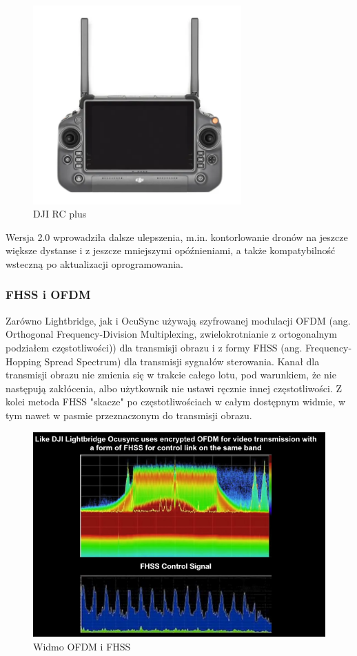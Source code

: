 \begin{figure}[!ht]
  \centering
  \includegraphics[width=8cm]{./Obrazy/dji-rc-plus.png}
  \caption{DJI RC plus}
  \end{figure}
  

Wersja 2.0 wprowadziła dalsze ulepszenia, m.in. kontorlowanie dronów na jeszcze większe dystanse i z jeszcze mniejszymi opóźnieniami, a także kompatybilność wsteczną po aktualizacji oprogramowania.

\newpage
\subsubsection{FHSS i  OFDM}

Zarówno Lightbridge, jak i OcuSync używają szyfrowanej modulacji OFDM (ang. Orthogonal Frequency-Division Multiplexing, zwielokrotnianie z ortogonalnym podziałem częstotliwości)) dla transmisji obrazu i z formy FHSS (ang. Frequency-Hopping Spread Spectrum) dla transmisji sygnałów sterowania. Kanał dla transmisji obrazu nie zmienia się w trakcie całego lotu, pod warunkiem, że nie następują zakłócenia, albo użytkownik nie ustawi ręcznie innej częstotliwości. Z kolei metoda FHSS "skacze" po częstotliwościach w całym dostępnym widmie, w tym nawet w pasmie przeznaczonym do transmisji obrazu.\cite{FHSS-wiki} \cite{OFDM-wiki}

\begin{figure}[!htbp]
\centering
\includegraphics[width=14cm]{./Obrazy/ocusync_spectrum_1.png}
\caption{Widmo OFDM i FHSS}
\end{figure}


